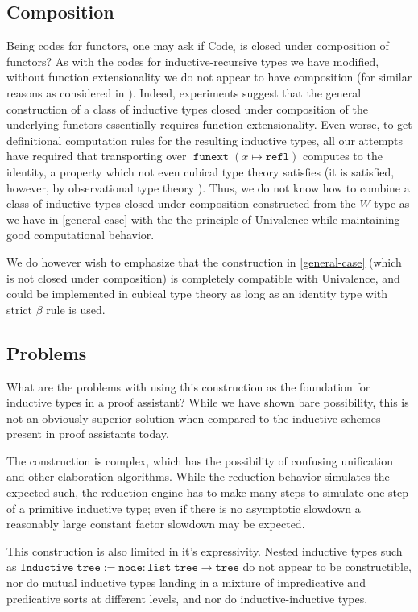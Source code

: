 \documentclass[a4paper,UKenglish,cleveref,nameinlink,autoref,thm-restate]{lipics-v2019}
\newcommand{\refl}{\mathtt{refl}}
\newcommand{\Code}{\mathrm{Code}}
\DeclareMathOperator{\funext}{\mathtt{funext}}
\begin{document}
\subsection{Composition}
Being codes for functors, one may ask if $\Code_i$ is closed under composition of functors? As with the codes for inductive-recursive types we have modified, without function extensionality we do not appear to have composition (for similar reasons as considered in \cite{variations-IR}). Indeed, experiments suggest that the general construction of a class of inductive types closed under composition of the underlying functors essentially requires function extensionality. Even worse, to get definitional computation rules for the resulting inductive types, all our attempts have required that transporting over $\funext(x\mapsto \refl)$ computes to the identity, a property which not even cubical type theory \cite{cchm-cubical} satisfies (it is satisfied, however, by observational type theory \cite{observational-type-theory}). Thus, we do not know how to combine a class of inductive types closed under composition constructed from the $W$ type as we have in \cref{general-case} with the the principle of Univalence \cite{hott-book} while maintaining good computational behavior.

We do however wish to emphasize that the construction in \cref{general-case} (which is not closed under composition) is completely compatible with Univalence, and could be implemented in cubical type theory as long as an identity type with strict $\beta$ rule is used.

\subsection{Problems}
What are the problems with using this construction as the foundation for inductive types in a proof assistant? While we have shown bare possibility, this is not an obviously superior solution when compared to the inductive schemes present in proof assistants today.

The construction is complex, which has the possibility of confusing unification and other elaboration algorithms. While the reduction behavior simulates the expected such, the reduction engine has to make many steps to simulate one step of a primitive inductive type; even if there is no asymptotic slowdown a reasonably large constant factor slowdown may be expected.

This construction is also limited in it's expressivity. Nested inductive types such as $\mathtt{Inductive}\;\mathtt{tree} := \mathtt{node} : \mathtt{list}\;\mathtt{tree} \to \mathtt{tree}$ do not appear to be constructible, nor do mutual inductive types landing in a mixture of impredicative and predicative sorts at different levels, and nor do inductive-inductive types.
\end{document}
